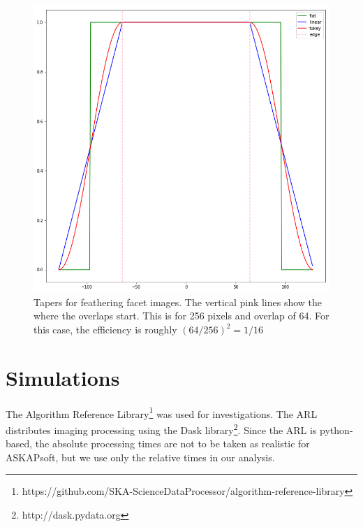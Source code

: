 \documentclass[11pt,a4paper,variablewidth]{article}
\begin{document}
\begin{figure}[htb]
  \centering
  \includegraphics[width=\textwidth]{./pngs/tapers.png}
  \caption{Tapers for feathering facet images. The vertical pink lines show the where the overlaps start. This is for 256 pixels and overlap of 64. For this case, the efficiency is roughly $(64/256)^2 = 1/16$}
  \label{fig:tapers}
\end{figure}

\pagebreak
\section{Simulations}
\label{sec:simulations}

The Algorithm Reference Library\footnote{https://github.com/SKA-ScienceDataProcessor/algorithm-reference-library} was used for investigations. The ARL distributes imaging processing using the Dask library\footnote{http://dask.pydata.org}. Since the ARL is python-based, the absolute processing times are not to be taken as realistic for ASKAPsoft, but we use only the relative times in our analysis. 
	
\end{document}
